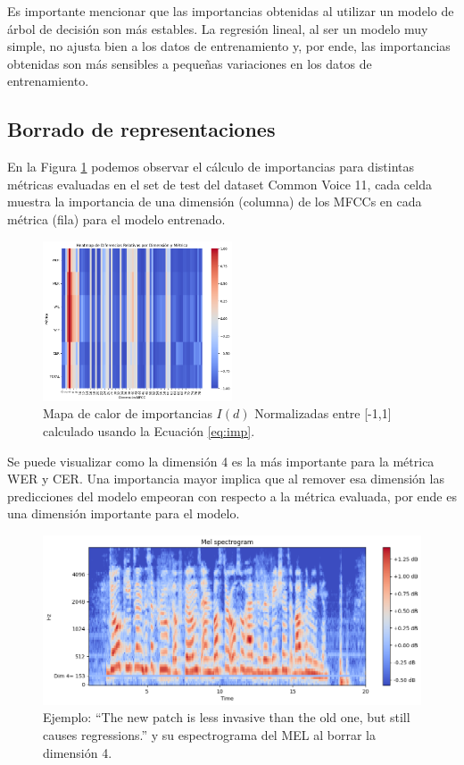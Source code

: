 \documentclass[conference]{IEEEtran}
\begin{document}
Es importante mencionar que las importancias obtenidas al utilizar un modelo de árbol de decisión son más estables. La regresión lineal, al ser un modelo muy simple, no ajusta bien a los datos de entrenamiento y, por ende, las importancias obtenidas son más sensibles a pequeñas variaciones en los datos de entrenamiento.

\subsection{Borrado de representaciones}

En la Figura \ref{fig:cv_imp} podemos observar el cálculo de importancias para distintas métricas evaluadas en el set de test del dataset Common Voice 11, cada celda muestra la importancia de una dimensión (columna) de los MFCCs en cada métrica (fila) para el modelo entrenado.

\begin{figure}[ht]
\centering
\includegraphics[width=0.5\textwidth]{images/importance_plot_all_dims.png}
\caption{Mapa de calor de importancias $I(d)$ Normalizadas entre [-1,1] calculado usando la Ecuación \ref{eq:imp}.}
\label{fig:cv_imp}
\end{figure}

Se puede visualizar como la dimensión 4 es la más importante para la métrica WER y CER.
Una importancia mayor implica que al remover esa dimensión las predicciones del modelo empeoran con respecto a la métrica evaluada, por ende es una dimensión importante para el modelo.

\begin{figure}[ht]
\centering
\includegraphics[width=\textwidth]{images/dim_4_erasured.png}
\caption{Ejemplo: “The new patch is less invasive than the old one, but still causes regressions.” y su espectrograma del MEL al borrar la dimensión 4.}
\label{fig:mel_erasure_dim_4}
\end{figure}
\end{document}

